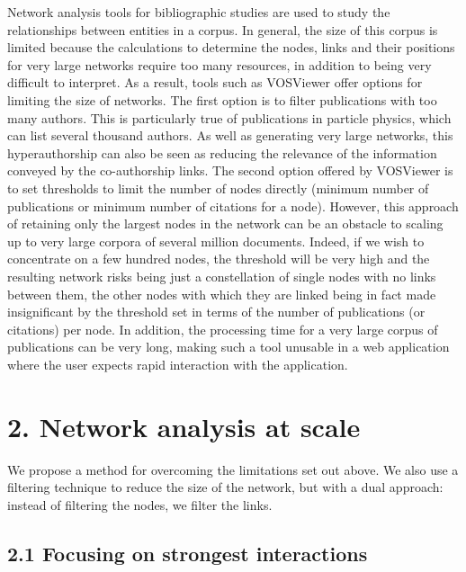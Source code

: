 \documentclass[
]{article}
\begin{document}
Network analysis tools for bibliographic studies are used to study the
relationships between entities in a corpus. In general, the size of this
corpus is limited because the calculations to determine the nodes, links
and their positions for very large networks require too many resources,
in addition to being very difficult to interpret. As a result, tools
such as VOSViewer offer options for limiting the size of networks. The
first option is to filter publications with too many authors. This is
particularly true of publications in particle physics, which can list
several thousand authors. As well as generating very large networks,
this hyperauthorship can also be seen as reducing the relevance of the
information conveyed by the co-authorship links. The second option
offered by VOSViewer is to set thresholds to limit the number of nodes
directly (minimum number of publications or minimum number of citations
for a node). However, this approach of retaining only the largest nodes
in the network can be an obstacle to scaling up to very large corpora of
several million documents. Indeed, if we wish to concentrate on a few
hundred nodes, the threshold will be very high and the resulting network
risks being just a constellation of single nodes with no links between
them, the other nodes with which they are linked being in fact made
insignificant by the threshold set in terms of the number of
publications (or citations) per node. In addition, the processing time
for a very large corpus of publications can be very long, making such a
tool unusable in a web application where the user expects rapid
interaction with the application.

\hypertarget{network-analysis-at-scale}{%
\section{2. Network analysis at scale}\label{network-analysis-at-scale}}

We propose a method for overcoming the limitations set out above. We
also use a filtering technique to reduce the size of the network, but
with a dual approach: instead of filtering the nodes, we filter the
links.

\hypertarget{focusing-on-strongest-interactions}{%
\subsection{2.1 Focusing on strongest
interactions}\label{focusing-on-strongest-interactions}}
\end{document}
